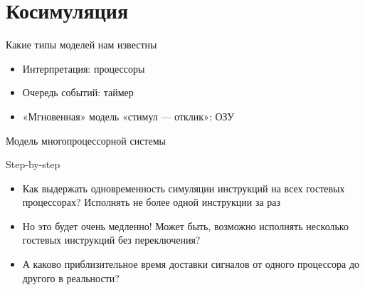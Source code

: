 \documentclass{beamer}
\begin{document}
\section{Косимуляция}

\begin{frame}{Какие типы моделей нам известны}

\begin{itemize}
    \item Интерпретация\pause: процессоры \pause
    \item Очередь событий\pause: таймер\pause
    \item «Мгновенная» модель «стимул — отклик»\pause: ОЗУ
\end{itemize}

\end{frame}



\begin{frame}{Модель многопроцессорной системы}

\end{frame}

\begin{frame}{Step-by-step}
\begin{itemize}
\item Как выдержать одновременность симуляции инструкций на всех гостевых процессорах? Исполнять не более одной инструкции за раз\pause
\item Но это будет очень медленно! Может быть, возможно исполнять несколько гостевых инструкций без переключения?\pause
\item А каково приблизительное время доставки сигналов от одного процессора до другого в реальности?
\end{itemize}
\end{frame}
\end{document}
